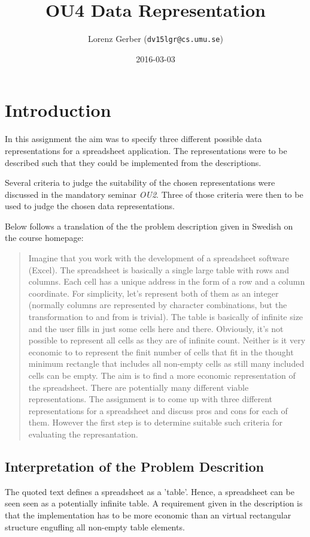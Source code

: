 \documentclass[a4paper,11pt,twoside]{article}
\title{OU4 Data Representation}
\author{Lorenz Gerber ({\tt{dv15lgr@cs.umu.se}})}
\date{2016-03-03}
\begin{document}
\lstset{language=C}
\maketitle

\tableofcontents
\newpage

\section{Introduction} 
In this assignment the aim was to specify three different possible
data representations for a spreadsheet application. The
representations were to be described such that they could be implemented
from the descriptions.
 
Several criteria to judge the suitability of the chosen representations were 
discussed in the mandatory seminar \emph{OU2}. Three of those criteria 
were then to be used to judge the chosen data representations.

Below follows a translation of the the problem description given in Swedish
on the course homepage:

\begin{quote}
Imagine that you work with the development of a spreadsheet software
(Excel). The spreadsheet is basically a single large table with rows
and columns. Each cell has a unique address in the form of a row and a
column coordinate. For simplicity, let's represent both of them as an
integer (normally columns are represented by character combinations,
but the transformation to and from is trivial). The table is basically 
of infinite size and the user fills in just some cells here and
there. Obviously, it's not possible to represent all cells as they are
of infinite count. Neither is it very economic to to represent the
finit number of cells that fit in the thought minimum rectangle
that includes all non-empty cells as still many included cells can be
empty. The aim is to find a more economic representation of the
spreadsheet. There are potentially many different viable
representations. The assignment is to come up with three different
representations for a spreadsheet and discuss pros and cons for each
of them. However the first step is to determine suitable such criteria
for evaluating the represantation.
\end{quote}


\subsection{Interpretation of the Problem Descrition}
The quoted text defines a spreadsheet as a 'table'. Hence,
a spreadsheet can be seen seen as a potentially infinite table. A
requirement given in the description is that the implementation has to
be more economic than an virtual rectangular structure engufling all
non-empty table elements.
\end{document}
